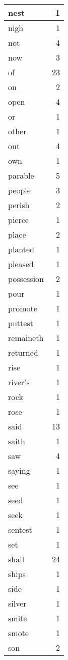 \begin{center}
\begin{longtable}{l|r}
nest & 1\\ \hline 
nigh & 1\\ \hline 
not & 4\\ \hline 
now & 3\\ \hline 
of & 23\\ \hline 
on & 2\\ \hline 
open & 4\\ \hline 
or & 1\\ \hline 
other & 1\\ \hline 
out & 4\\ \hline 
own & 1\\ \hline 
parable & 5\\ \hline 
people & 3\\ \hline 
perish & 2\\ \hline 
pierce & 1\\ \hline 
place & 2\\ \hline 
planted & 1\\ \hline 
pleased & 1\\ \hline 
possession & 2\\ \hline 
pour & 1\\ \hline 
promote & 1\\ \hline 
puttest & 1\\ \hline 
remaineth & 1\\ \hline 
returned & 1\\ \hline 
rise & 1\\ \hline 
river's & 1\\ \hline 
rock & 1\\ \hline 
rose & 1\\ \hline 
said & 13\\ \hline 
saith & 1\\ \hline 
saw & 4\\ \hline 
saying & 1\\ \hline 
see & 1\\ \hline 
seed & 1\\ \hline 
seek & 1\\ \hline 
sentest & 1\\ \hline 
set & 1\\ \hline 
shall & 24\\ \hline 
ships & 1\\ \hline 
side & 1\\ \hline 
silver & 1\\ \hline 
smite & 1\\ \hline 
smote & 1\\ \hline 
son & 2\\ \hline 

\end{longtable}
\end{center}
